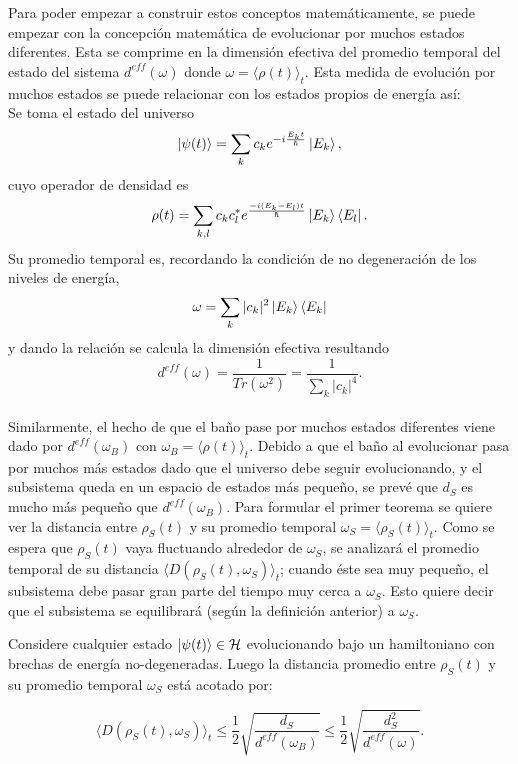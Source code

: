 Para poder empezar a construir estos conceptos matemáticamente, se puede empezar con la concepción matemática de evolucionar por muchos estados diferentes. Esta se comprime en la dimensión efectiva del promedio temporal del estado del sistema $d^{eff}(\omega)$ donde $\omega= \big \langle \rho(t) \big\rangle_{t}$. Esta medida de evolución por muchos estados se puede relacionar con los estados propios de energía así:
\\
Se toma el estado del universo
\begin{equation}
\ket{\psi(t)} = \sum_{k} c_{k} e^{-i\frac{E_{k}t}{\hbar}} \ket{E_{k}},
\end{equation}
cuyo operador de densidad es 
\begin{equation}
\rho(t)=\sum_{k,l} c_{k} c_{l}^{*} e^{\frac{-i(E_{k}-E_{l})t}{\hbar}}\ket{E_{k}} \bra{E_{l}}.
\end{equation}
Su promedio temporal es, recordando la condición de no degeneración de los niveles de energía,
\begin{equation}
\omega= \sum_{k} |c_{k}|^{2} \ket{E_{k}} \bra{E_{k}}
\end{equation}
y dando la relación se calcula la dimensión efectiva resultando 
\begin{equation}
d^{eff}(\omega)=\frac{1}{Tr(\omega^{2})}=\frac{1}{\sum_{k} |c_{k}|^{4} }.
\end{equation}
\\
Similarmente, el hecho de que el baño pase por muchos estados diferentes viene dado por $d^{eff}(\omega_{B})$ con $\omega_{B}=\langle \rho(t) \rangle_{t}$. Debido a que el baño al evolucionar pasa por muchos más estados dado que el universo debe seguir evolucionando, y el subsistema queda en un espacio de estados más pequeño, se prevé que $d_{S}$ es mucho más pequeño que $d^{eff}(\omega_{B})$. Para formular el primer teorema se quiere ver la distancia entre $\rho_{S}(t)$ y su promedio temporal $\omega_{S}= \langle \rho_{S}(t) \rangle_{t}$. Como se espera que $\rho_{S}(t) $ vaya fluctuando alrededor de $\omega_{S}$, se analizará el promedio temporal de su distancia $\langle D(\rho_{S}(t) ,\omega_{S}) \rangle_{t}$; cuando éste sea muy pequeño, el subsistema debe pasar gran parte del tiempo muy cerca a $\omega_{S}$. Esto quiere decir que el subsistema se equilibrará (según la definición anterior) a $\omega_{S}$.

\begin{theorem} \label{equlibracion}

Considere cualquier estado $\ket{\psi(t)} \in \mathcal{H}$ evolucionando bajo un hamiltoniano con brechas de energía no-degeneradas. Luego la distancia promedio entre $\rho_{S}(t)$ y su promedio temporal $\omega_{S}$ está acotado por:

\begin{equation}
\langle D(\rho_{S}(t) ,\omega_{S}) \rangle_{t} \le \frac{1}{2} \sqrt{\frac{d_{S}}{d^{eff}(\omega_{B})}} \le \frac{1}{2} \sqrt{\frac{d_{S}^{2}}{d^{eff}(\omega)}}.
\end{equation}
\end{theorem}

